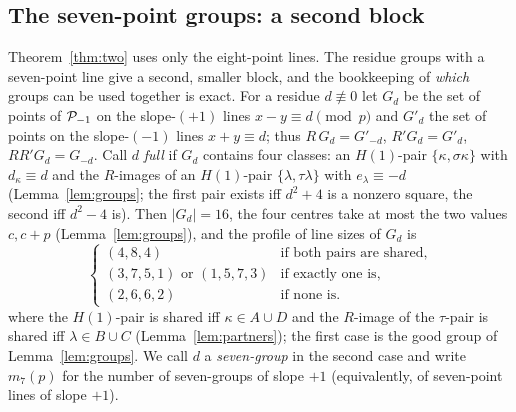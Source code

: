 \subsection*{The seven-point groups: a second block}

Theorem~\ref{thm:two} uses only the eight-point lines.  The residue groups with a seven-point line give a second, smaller block, and the
bookkeeping of \emph{which} groups can be used together is exact.  For a residue $d\not\equiv0$ let $G_d$ be the set of points of $\mathcal{P}_{-1}$
on the slope-$(+1)$ lines $x-y\equiv d\pmod p$ and $G'_d$ the set of points on the slope-$(-1)$ lines $x+y\equiv d$; thus
$R\,G_d=G'_{-d}$, $R'G_d=G'_d$, $RR'G_d=G_{-d}$.  Call $d$ \emph{full} if $G_d$ contains four classes: an $H(1)$-pair $\{\kappa,\sigma\kappa\}$
with $d_\kappa\equiv d$ and the $R$-images of an $H(1)$-pair $\{\lambda,\tau\lambda\}$ with $e_\lambda\equiv-d$ (Lemma~\ref{lem:groups}; the
first pair exists iff $d^2+4$ is a nonzero square, the second iff $d^2-4$ is).  Then $|G_d|=16$, the four centres take at most the two
values $c,c+p$ (Lemma~\ref{lem:groups}), and the profile of line sizes of $G_d$ is
\[
\begin{cases}(4,8,4)&\text{if both pairs are shared},\\(3,7,5,1)\text{ or }(1,5,7,3)&\text{if exactly one is},\\(2,6,6,2)&\text{if none is}.\end{cases}
\]
where the $H(1)$-pair is shared iff $\kappa\in A\cup D$ and the $R$-image of the $\tau$-pair is shared iff $\lambda\in B\cup C$
(Lemma~\ref{lem:partners}); the first case is the good group of Lemma~\ref{lem:groups}.  We call $d$ a \emph{seven-group} in the second
case and write $m_7(p)$ for the number of seven-groups of slope $+1$ (equivalently, of seven-point lines of slope $+1$).

